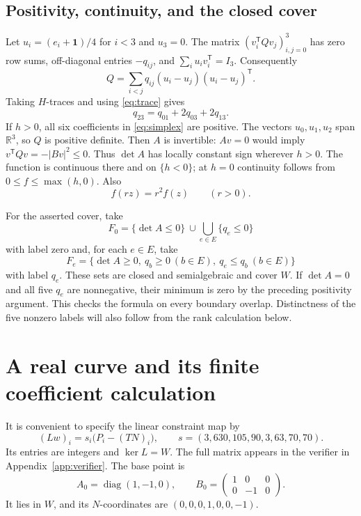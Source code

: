 \documentclass[11pt]{article}
\newcommand{\R}{\mathbb R}
\newcommand{\transpose}{^{\mathsf T}}
\DeclareMathOperator{\diag}{diag}
\begin{document}
\subsection{Positivity, continuity, and the closed cover}
Let $u_i=(e_i+\mathbf1)/4$ for $i<3$ and $u_3=0$.
The matrix $(v_i\transpose Qv_j)_{i,j=0}^3$ has zero row sums,
off-diagonal entries $-q_{ij}$, and $\sum_i u_iv_i\transpose=I_3$.
Consequently
\begin{equation}\label{eq:simplex}
 Q=\sum_{i<j}q_{ij}(u_i-u_j)(u_i-u_j)\transpose.
\end{equation}
Taking $H$-traces and using \eqref{eq:trace} gives
\begin{equation}\label{eq:labelrelation}
 q_{23}=q_{01}+2q_{03}+2q_{13}.
\end{equation}
If $h>0$, all six coefficients in \eqref{eq:simplex} are positive.
The vectors $u_0,u_1,u_2$ span $\R^3$, so $Q$ is positive definite.
Then $A$ is invertible: $Av=0$ would imply
$v\transpose Qv=-|Bv|^2\leq0$. Thus $\det A$ has locally constant
sign wherever $h>0$. The function is continuous there and on $\{h<0\}$;
at $h=0$ continuity follows from $0\leq f\leq\max(h,0)$.
Also
\begin{equation}\label{eq:homog}
 f(rz)=r^2f(z)\qquad(r>0).
\end{equation}

For the asserted cover, take
\[
 F_0=\{\det A\leq0\}\ \cup\!\bigcup_{e\in E}\{q_e\leq0\}
\]
with label zero and, for each $e\in E$, take
\[
 F_e=\{\det A\geq0,\ q_b\geq0\ (b\in E),\ q_e\leq q_b\ (b\in E)\}
\]
with label $q_e$. These sets are closed and semialgebraic and cover $W$.
If $\det A=0$ and all five $q_e$ are nonnegative, their minimum is zero
by the preceding positivity argument. This checks the formula on every
boundary overlap. Distinctness of the five nonzero labels will also follow
from the rank calculation below.

\section{A real curve and its finite coefficient calculation}
It is convenient to specify the linear constraint map by
\[
 (Lw)_i=s_i\bigl(P_i-(TN)_i\bigr),\qquad
 s=(3,630,105,90,3,63,70,70).
\]
Its entries are integers and $\ker L=W$. The full matrix appears in
the verifier in Appendix~\ref{app:verifier}.
The base point is
\begin{equation}\label{eq:base}
 A_0=\diag(1,-1,0),\qquad
 B_0=\begin{pmatrix}1&0&0\\0&-1&0\end{pmatrix}.
\end{equation}
It lies in $W$, and its $N$-coordinates are $(0,0,0,1,0,0,-1)$.
\end{document}
